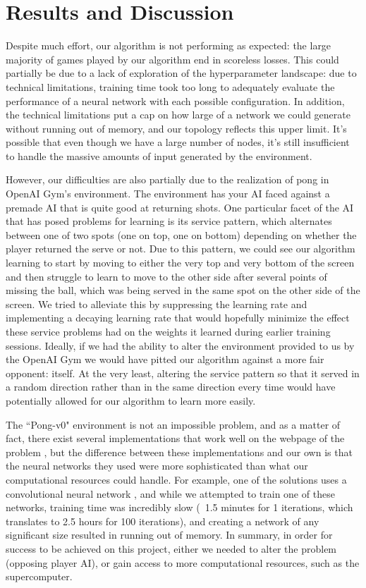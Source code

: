 \documentclass[12pt]{article}
\theoremstyle{plain}
\theoremstyle{definition}
\theoremstyle{remark}
\theoremstyle{plain}
\begin{document}
\section{Results and Discussion}
\par 
Despite much effort, our algorithm is not performing as expected: the large majority of games played by our algorithm end in scoreless losses.  This could partially be due to a lack of exploration of the hyperparameter landscape: due to technical limitations, training time took too long to adequately evaluate the performance of a neural network with each possible configuration.  In addition, the technical limitations put a cap on how large of a network we could generate without running out of memory, and our topology reflects this upper limit.  It's possible that even though we have a large number of nodes, it's still insufficient to handle the massive amounts of input generated by the environment.
\par
However, our difficulties are also partially due to the realization of pong in OpenAI Gym's environment.  The environment has your AI faced against a premade AI that is quite good at returning shots.  One particular facet of the AI that has posed problems for learning is its service pattern, which alternates between one of two spots (one on top, one on bottom) depending on whether the player returned the serve or not.  Due to this pattern, we could see our algorithm learning to start by moving to either the very top and very bottom of the screen and then struggle to learn to move to the other side after several points of missing the ball, which was being served in the same spot on the other side of the screen.  We tried to alleviate this by suppressing the learning rate and implementing a decaying learning rate that would hopefully minimize the effect these service problems had on the weights it learned during earlier training sessions.  Ideally, if we had the ability to alter the environment provided to us by the OpenAI Gym we would have pitted our algorithm against a more fair opponent: itself.  At the very least, altering the service pattern so that it served in a random direction rather than in the same direction every time would have potentially allowed for our algorithm to learn more easily.
\par
The ``Pong-v0" environment is not an impossible problem, and as a matter of fact, there exist several implementations that work well on the webpage of the problem \cite{pong}, but the difference between these implementations and our own is that the neural networks they used were more sophisticated than what our computational resources could handle.  For example, one of the solutions uses a convolutional neural network \cite{eval,conv}, and while we attempted to train one of these networks, training time was incredibly slow (~1.5 minutes for 1 iterations, which translates to 2.5 hours for 100 iterations), and creating a network of any significant size resulted in running out of memory.  In summary, in order for success to be achieved on this project, either we needed to alter the problem (opposing player AI), or gain access to more computational resources, such as the supercomputer.
\end{document}
